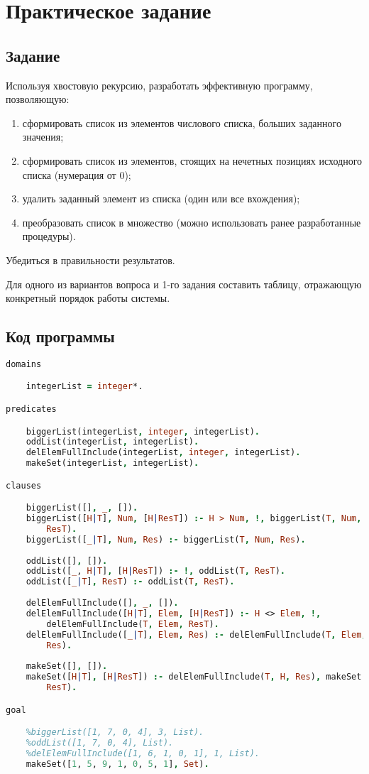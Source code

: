 \documentclass[14pt,a4paper]{scrreprt}
\begin{document}


\thispagestyle{empty}

\chapter{Практическое задание}

\section{Задание}

Используя хвостовую рекурсию, разработать эффективную программу, позволяющую:
\begin{enumerate}
	\item сформировать список из элементов числового списка, больших заданного значения;
	\item сформировать список из элементов, стоящих на нечетных позициях исходного списка (нумерация от 0);
	\item удалить заданный элемент из списка (один или все вхождения);
	\item преобразовать список в множество (можно использовать ранее разработанные процедуры).
\end{enumerate}
Убедиться в правильности результатов.

Для одного из вариантов вопроса и 1-го задания составить таблицу, отражающую конкретный порядок работы системы.

\section{Код программы}

\begin{lstlisting}[language=Prolog]
domains

	integerList = integer*.

predicates

	biggerList(integerList, integer, integerList).
	oddList(integerList, integerList).
	delElemFullInclude(integerList, integer, integerList).
	makeSet(integerList, integerList).

clauses

	biggerList([], _, []).
	biggerList([H|T], Num, [H|ResT]) :- H > Num, !, biggerList(T, Num, 
		ResT).
	biggerList([_|T], Num, Res) :- biggerList(T, Num, Res).
	
	oddList([], []).
	oddList([_, H|T], [H|ResT]) :- !, oddList(T, ResT).
	oddList([_|T], ResT) :- oddList(T, ResT).
	
	delElemFullInclude([], _, []).
	delElemFullInclude([H|T], Elem, [H|ResT]) :- H <> Elem, !, 
		delElemFullInclude(T, Elem, ResT).
	delElemFullInclude([_|T], Elem, Res) :- delElemFullInclude(T, Elem, 
		Res).
	
	makeSet([], []).
	makeSet([H|T], [H|ResT]) :- delElemFullInclude(T, H, Res), makeSet(Res, 
		ResT).

goal

	%biggerList([1, 7, 0, 4], 3, List).
	%oddList([1, 7, 0, 4], List).
	%delElemFullInclude([1, 6, 1, 0, 1], 1, List).
	makeSet([1, 5, 9, 1, 0, 5, 1], Set).
\end{lstlisting}
\end{document}
